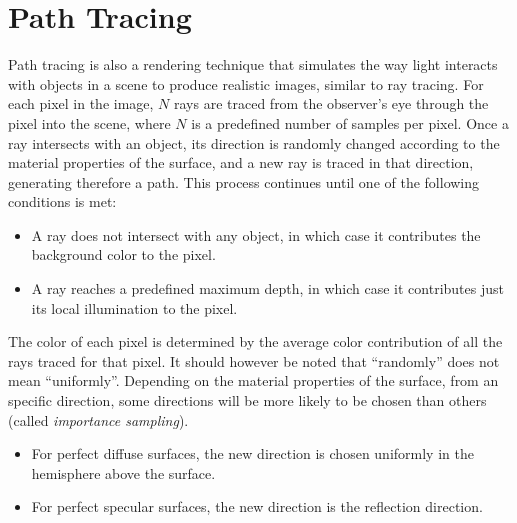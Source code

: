 \section{Path Tracing}\label{sec:path_tracing}

Path tracing is also a rendering technique that simulates the way light interacts with objects in a scene to produce realistic images, similar to ray tracing. For each pixel in the image, $N$ rays are traced from the observer's eye through the pixel into the scene, where $N$ is a predefined number of samples per pixel. Once a ray intersects with an object, its direction is randomly changed according to the material properties of the surface, and a new ray is traced in that direction, generating therefore a path. This process continues until one of the following conditions is met:
\begin{itemize}
    \item A ray does not intersect with any object, in which case it contributes the background color to the pixel.
    \item A ray reaches a predefined maximum depth, in which case it contributes just its local illumination to the pixel.
\end{itemize}

The color of each pixel is determined by the average color contribution of all the rays traced for that pixel. It should however be noted that ``randomly'' does not mean ``uniformly''. Depending on the material properties of the surface, from an specific direction, some directions will be more likely to be chosen than others (called \emph{importance sampling}).
\begin{itemize}
    \item For perfect diffuse surfaces, the new direction is chosen uniformly in the hemisphere above the surface.
    \item For perfect specular surfaces, the new direction is the reflection direction.
\end{itemize}
